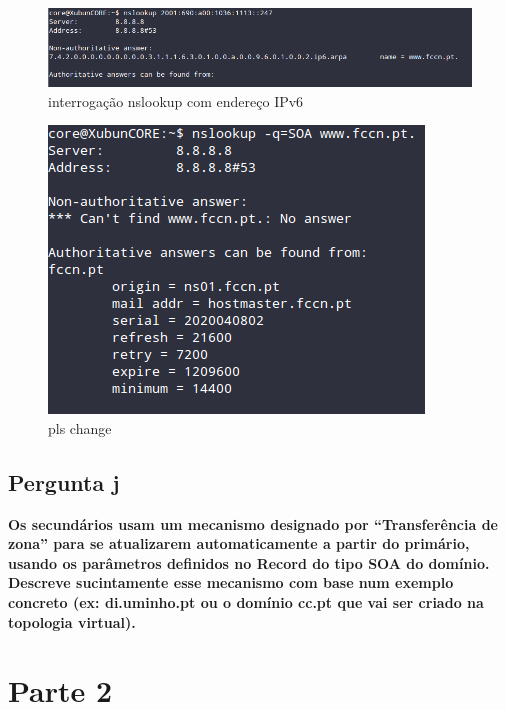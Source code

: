 \documentclass[a4paper]{report}
\begin{document}
\begin{figure}[H]
    \centering 
    \includegraphics[width=\textwidth]{images/nslookup_ipv6.png}  
    \caption{interrogação nslookup com endereço IPv6}
    \label{fig:nslookup_ipv6}
\end{figure}

\begin{figure}[H]
    \centering 
    \includegraphics[width=\textwidth]{images/fccn_pt.png}  
    \caption{pls change}
    \label{fig:fccn_pt}
\end{figure}

\section{Pergunta j}
\textbf{Os secundários usam um mecanismo designado por “Transferência de zona”
para se atualizarem automaticamente a partir do primário, usando os parâmetros
definidos no Record do tipo SOA do domínio. Descreve sucintamente esse mecanismo
com base num exemplo concreto (ex: di.uminho.pt ou o domínio cc.pt que vai ser
criado na topologia virtual).}

\chapter{Parte 2}
\end{document}
